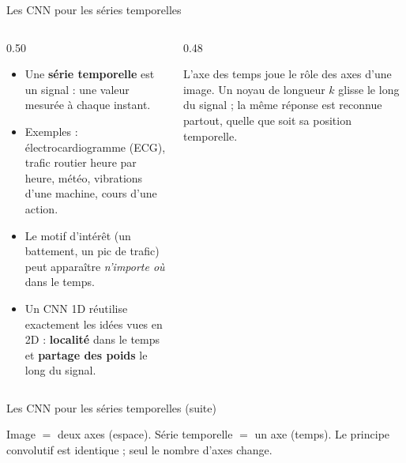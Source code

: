 
\begin{frame}{Les CNN pour les séries temporelles}
\begin{columns}[t]
\begin{column}{0.50\textwidth}
\begin{itemize}
  \item Une \textbf{série temporelle} est un signal : une valeur mesurée
  à chaque instant.
  \item Exemples : électrocardiogramme (ECG), trafic routier heure par heure,
  météo, vibrations d'une machine, cours d'une action.
  \item Le motif d'intérêt (un battement, un pic de trafic) peut apparaître
  \emph{n'importe où} dans le temps.
  \item Un CNN 1D réutilise exactement les idées vues en 2D :
  \textbf{localité} dans le temps et \textbf{partage des poids} le long du signal.
\end{itemize}
\end{column}
\begin{column}{0.48\textwidth}
\begin{kbox}[La transposition]
L'axe des temps joue le rôle des axes d'une image. Un noyau de longueur
$k$ glisse le long du signal ; la même réponse est reconnue partout,
quelle que soit sa position temporelle.
\end{kbox}

\end{column}
\end{columns}
\end{frame}
\begin{frame}{Les CNN pour les séries temporelles (suite)}
\begin{ebox}
Image $=$ deux axes (espace). Série temporelle $=$ un axe (temps). Le
principe convolutif est identique ; seul le nombre d'axes change.
\end{ebox}
\end{frame}

